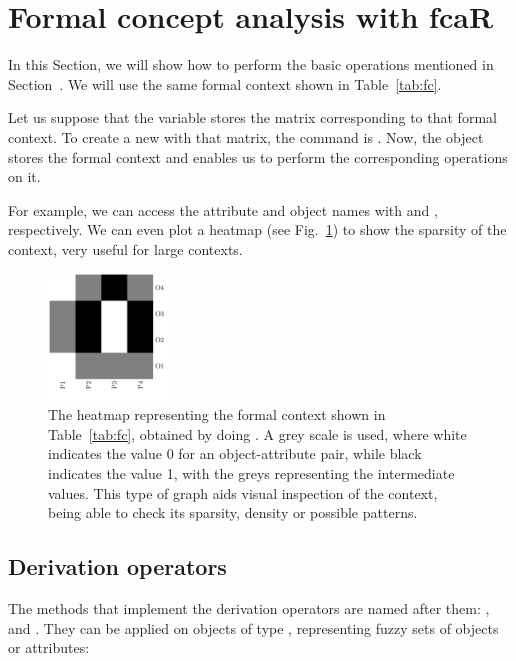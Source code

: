 \hypertarget{fcaR}{%
\section{Formal concept analysis with fcaR}\label{fcaR}}

In this Section, we will show how to perform the basic operations
mentioned in Section~. We will use the same formal
context shown in Table~\ref{tab:fc}.

Let us suppose that the variable  stores the matrix
corresponding to that formal context. To create a new
 with that matrix, the command is
. Now, the object  stores
the formal context and enables us to perform the corresponding
operations on it.

For example, we can access the attribute and object names with
 and , respectively. We can even
plot a heatmap (see Fig.~\ref{fig:heatmap}) to show the sparsity of the
context, very useful for large contexts.

\begin{figure}
\centering\includegraphics[width=0.3\textwidth]{fig-context-heatmap.pdf}
\caption{\label{fig:heatmap}The heatmap representing the formal context shown in Table~\ref{tab:fc}, obtained by doing . A grey scale is used, where white indicates the value 0 for an object-attribute pair, while black indicates the value 1, with the greys representing the intermediate values. This type of graph aids visual inspection of the context, being able to check its sparsity, density or possible patterns.}
\end{figure}

\hypertarget{derivation-operators-1}{%
\subsection{Derivation operators}\label{derivation-operators-1}}

The methods that implement the derivation operators are named after
them: ,  and . They can be
applied on objects of type , representing fuzzy sets of
objects or attributes:


